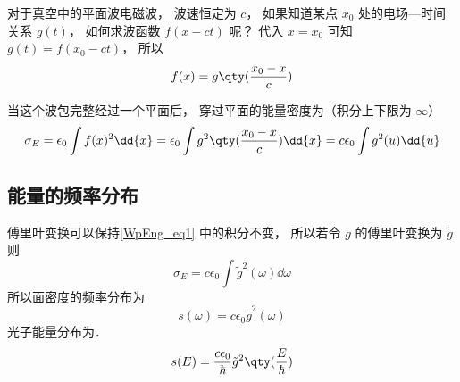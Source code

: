 

对于真空中的平面波电磁波， 波速恒定为 $c$， 如果知道某点 $x_0$ 处的电场—时间关系 $g(t)$， 如何求波函数 $f(x - ct)$ 呢？ 代入 $x = x_0$ 可知 $g(t) = f(x_0 - ct)$， 所以
\begin{equation}
f(x) = g\qty(\frac{x_0 - x}{c})
\end{equation}

当这个波包完整经过一个平面后， 穿过平面的能量密度为（积分上下限为 $\infty$）
\begin{equation}\label{WpEng_eq1}
\sigma_E = \epsilon_0 \int f(x)^2 \dd{x} = \epsilon_0  \int g^2\qty(\frac{x_0 - x}{c}) \dd{x} = c\epsilon_0 \int g^2(u) \dd{u}
\end{equation}

\subsection{能量的频率分布}
傅里叶变换可以保持\autoref{WpEng_eq1} 中的积分不变， 所以若令 $g$ 的傅里叶变换为 $\tilde g$ 则
\begin{equation}
\sigma_E = c\epsilon_0 \int {\tilde g}^2(\omega) \dd{\omega}
\end{equation}
所以面密度的频率分布为
\begin{equation}
s(\omega) = c\epsilon_0 {\tilde g}^2(\omega)
\end{equation}
光子能量分布为．
\begin{equation}
s(E) = \frac{c\epsilon_0}{\hbar} {\tilde g}^2\qty(\frac{E}{\hbar})
\end{equation}
